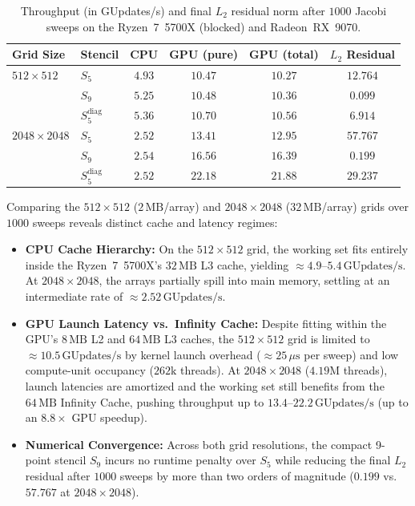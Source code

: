 \begin{table}[htbp]
    \centering
    \caption{Throughput (in GUpdates/s) and final $L_2$ residual norm after $1000$ Jacobi sweeps on the Ryzen~7~5700X (blocked) and Radeon~RX~9070.}
    \label{tab:convergence_perf}
    \small
    \begin{tabular}{llcccc}
        \hline
        \textbf{Grid Size} & \textbf{Stencil} & \textbf{CPU} & \textbf{GPU (pure)} & \textbf{GPU (total)} & \textbf{$L_2$ Residual} \\
        \hline
        $512 \times 512$   & $S_5$               & $4.93$ & $10.47$ & $10.27$ & $12.764$ \\
                           & $S_9$               & $5.25$ & $10.48$ & $10.36$ & $0.099$  \\
                           & $S_5^{\text{diag}}$ & $5.36$ & $10.70$ & $10.56$ & $6.914$  \\
        \hline
        $2048 \times 2048$ & $S_5$               & $2.52$ & $13.41$ & $12.95$ & $57.767$ \\
                           & $S_9$               & $2.54$ & $16.56$ & $16.39$ & $0.199$  \\
                           & $S_5^{\text{diag}}$ & $2.52$ & $22.18$ & $21.88$ & $29.237$ \\
        \hline
    \end{tabular}
\end{table}

Comparing the $512 \times 512$ ($2\,\text{MB}$/array) and $2048 \times 2048$ ($32\,\text{MB}$/array) grids over $1000$ sweeps reveals distinct cache and latency regimes:
\begin{itemize}
    \item \textbf{CPU Cache Hierarchy:} On the $512 \times 512$ grid, the working set fits entirely inside the Ryzen~7~5700X's $32\,\text{MB}$ L3 cache, yielding $\approx 4.9\text{--}5.4\,\text{GUpdates/s}$. At $2048 \times 2048$, the arrays partially spill into main memory, settling at an intermediate rate of $\approx 2.52\,\text{GUpdates/s}$.
    \item \textbf{GPU Launch Latency vs.\ Infinity Cache:} Despite fitting within the GPU's $8\,\text{MB}$ L2 and $64\,\text{MB}$ L3 caches, the $512 \times 512$ grid is limited to $\approx 10.5\,\text{GUpdates/s}$ by kernel launch overhead ($\approx 25\,\mu\text{s}$ per sweep) and low compute-unit occupancy ($262\text{k}$ threads). At $2048 \times 2048$ ($4.19\text{M}$ threads), launch latencies are amortized and the working set still benefits from the $64\,\text{MB}$ Infinity Cache, pushing throughput up to $13.4\text{--}22.2\,\text{GUpdates/s}$ (up to an $8.8\times$ GPU speedup).
    \item \textbf{Numerical Convergence:} Across both grid resolutions, the compact 9-point stencil $S_9$ incurs no runtime penalty over $S_5$ while reducing the final $L_2$ residual after $1000$ sweeps by more than two orders of magnitude ($0.199$ vs.\ $57.767$ at $2048 \times 2048$).
\end{itemize}

